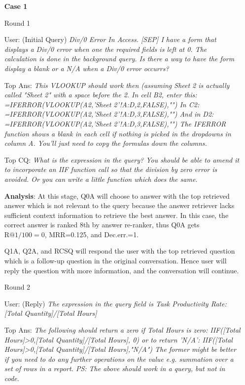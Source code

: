 \documentclass[format=acmsmall, review=False, screen=true]{acmart}
\begin{document}
\begin{itemize}
    \item[\textbf{Case 1}]
    \item[Round 1]
    \item[User:] (Initial Query) \textit{Div/0 Error In Access. [SEP] I have a form that displays a Div/0 error when one the required fields is left at 0. The calculation is done in the background query. Is there a way to have the form display a blank or a N/A when a Div/0 error occurrs?}
    
    \item[Top Ans:] \textit{This VLOOKUP should work then (assuming Sheet 2 is actually called "Sheet 2" with a space before the 2. In cell B2, enter this: =IFERROR(VLOOKUP(A2,'Sheet 2'!A:D,2,FALSE),"") In C2: =IFERROR(VLOOKUP(A2,'Sheet 2'!A:D,3,FALSE),"") And in D2: =IFERROR(VLOOKUP(A2,'Sheet 2'!A:D,3,FALSE),"") The IFERROR function shows a blank in each cell if nothing is picked in the dropdowns in column A. You'll just need to copy the formulas down the columns.}
    
    \item[Top CQ:] \textit{What is the expression in the query? You should be able to amend it to incorporate an IIF function call so that the division by zero error is avoided. Or you can write a little function which does the same.}

    \item[\textbf{Analysis}:]
    At this stage, Q0A will choose to answer with the top retrieved answer which is not relevant to the query because the answer retriever lacks sufficient context information to retrieve the best answer. In this case, the correct answer is ranked 8th by answer re-ranker, thus Q0A gets $\text{R@1/100}=0$, MRR=0.125, and Dec.err.=1. 
    
    Q1A, Q2A, and RCSQ will respond the user with the top retrieved question which is a follow-up question in the original conversation. Hence user will reply the question with more information, and the conversation will continue.
    
    \item[Round 2]
    \item[User:] (Reply) \textit{The expression in the query field is Task Productivity Rate: [Total Quantity]/[Total Hours]}
    
    \item[Top Ans:] \textit{The following should return a zero if Total Hours is zero: IIF([Total Hours]>0,[Total Quantity]/[Total Hours], 0) or to return 'N/A': IIF([Total Hours]>0,[Total Quantity]/[Total Hours],"N/A") The former might be better if you need to do any further operations on the value e.g. summation over a set of rows in a report. PS: The above should work in a query, but not in code.}
    

\end{itemize}
\end{document}
